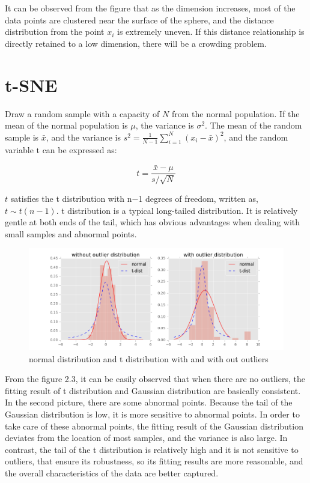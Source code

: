 \noindent It can be observed from the figure that as the dimension increases, most of the data points are clustered near the surface of the sphere, and the distance distribution from the point $x_i$ is extremely uneven. If this distance relationship is directly retained to a low dimension, there will be a crowding problem.

\section{t-SNE}
Draw a random sample with a capacity of $N$ from the normal population. If the mean of the normal population is $μ$, the variance is $\sigma^2$. The mean of the random sample is $\bar{x}$, and the variance is $s^2=  \frac {1}{N−1} \sum ^N_{i=1} (x_i−\bar{x})^2$, and the random variable t can be expressed as:

\begin{equation*}
    {t} =  \frac {\bar{x} - \mu}{s / \sqrt{N}} 
\end{equation*}

\noindent $t$ satisfies the t distribution with n−1 degrees of freedom, written as, $t∼t(n−1)$. t distribution is a typical long-tailed distribution. It is relatively gentle at both ends of the tail, which has obvious advantages when dealing with small samples and abnormal points.\\

\begin{figure}[ht]

\centering
\includegraphics[scale=0.6]{images/image_t-distribution.png}
\caption{normal distribution and t distribution with and with out outliers}
\label{fig:label}
\end{figure}

\noindent From the figure 2.3, it can be easily observed that when there are no outliers, the fitting result of t distribution and Gaussian distribution are basically consistent. In the second picture, there are some abnormal points. Because the tail of the Gaussian distribution is low, it is more sensitive to abnormal points. In order to take care of these abnormal points, the fitting result of the Gaussian distribution deviates from the location of most samples, and the variance is also large. In contrast, the tail of the t distribution is relatively high and it is not sensitive to outliers, that ensure its robustness, so its fitting results are more reasonable, and the overall characteristics of the data are better captured.\\

